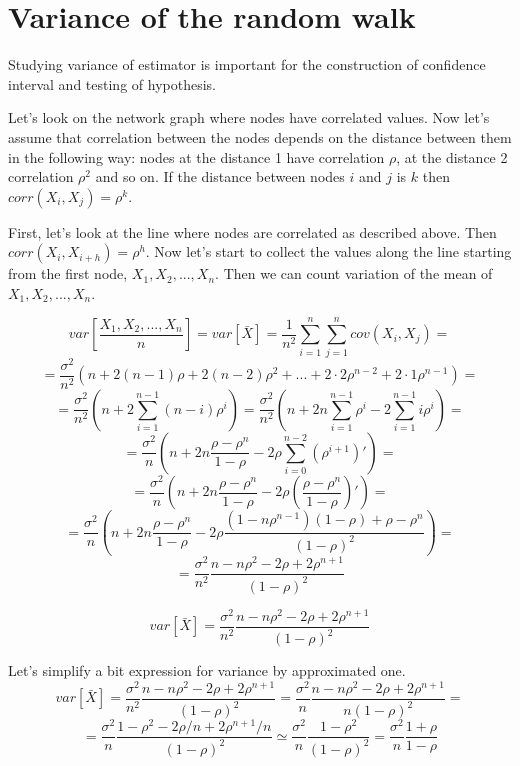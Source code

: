 \documentclass[12pt]{report}
\begin{document}
\chapter{Variance of the random walk}

Studying variance of estimator is important for the construction of confidence interval and testing of hypothesis.


Let's look on the network graph where nodes have correlated values. Now let's assume that correlation between the nodes depends on the distance between them in the following way: nodes at the distance 1 have correlation $\rho$, at the distance 2 correlation $\rho^2$ and so on.
If the distance between nodes $i$ and $j$ is $k$ then $corr(X_i, X_j) = \rho^k$.

First, let's look at the line where nodes are correlated as described above. Then $corr(X_i, X_{i+h}) = \rho^h$. Now let's start to collect the values along the line starting from the first node, $X_1, X_2, ..., X_n$. Then we can count variation of the mean of $X_1, X_2, ..., X_n$.

$$var\left[ \frac{X_1, X_2, ..., X_n}{n} \right] = var\left[\bar{X} \right] = \frac{1}{n^2} \sum_{i=1}^{n}\sum_{j=1}^{n} cov(X_i, X_j) =$$ 
$$ = \frac{\sigma^2}{n^2} \left( n + 2(n-1)\rho + 2(n-2)\rho^2 + ... + 2\cdot2 \rho^{n-2}+ 2\cdot1 \rho^{n-1} \right) = $$
$$ = \frac{\sigma^2}{n^2} \left(n + 2\sum_{i=1}^{n-1} (n-i)\rho^i \right) = \frac{\sigma^2}{n^2} \left(n + 2n\sum_{i=1}^{n-1}\rho^i - 2\sum_{i=1}^{n-1}i\rho^i \right) = $$
$$ = \frac{\sigma^2}{n} \left(n + 2n\frac{\rho-\rho^{n}}{1-\rho} - 2\rho \sum_{i=0}^{n-2} (\rho^{i+1})' \right) = $$
$$ = \frac{\sigma^2}{n} \left(n + 2n\frac{\rho-\rho^{n}}{1-\rho} - 2\rho\left(\frac{\rho-\rho^n}{1-\rho}\right)' \right) = $$
$$ = \frac{\sigma^2}{n} \left(n + 2n\frac{\rho-\rho^{n}}{1-\rho} - 2\rho \frac{(1-n\rho^{n-1})(1-\rho) + \rho - \rho^n}{(1-\rho)^2} \right) = $$
$$ = \frac{\sigma^2}{n^2} \frac{n-n\rho^2 - 2\rho + 2\rho^{n+1}}{(1-\rho)^2}$$


$$ var\left[\bar{X} \right] = \frac{\sigma^2}{n^2} \frac{n-n\rho^2 - 2\rho + 2\rho^{n+1}}{(1-\rho)^2}$$



Let's simplify a bit expression for variance by approximated one.
$$var\left[\bar{X} \right] = \frac{\sigma^2}{n^2} \frac{n-n\rho^2 - 2\rho + 2\rho^{n+1}}{(1-\rho)^2} = \frac{\sigma^2}{n} \frac{n-n\rho^2 - 2\rho + 2\rho^{n+1}}{n(1-\rho)^2} = $$
$$= \frac{\sigma^2}{n} \frac{1-\rho^2 - 2\rho/n + 2\rho^{n+1}/n}{(1-\rho)^2} \simeq \frac{\sigma^2}{n} \frac{1-\rho^2}{(1-\rho)^2} = \frac{\sigma^2}{n} \frac{1+\rho}{1-\rho}$$
\end{document}
